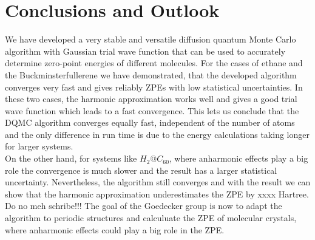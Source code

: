 \documentclass [12pt]{report}
\begin{document}
\chapter{Conclusions and Outlook}
We have developed a very stable and versatile diffusion quantum Monte Carlo algorithm with Gaussian trial wave function that can be used to accurately determine zero-point energies of different molecules. For the cases of ethane and the Buckminsterfullerene we have demonstrated, that the developed algorithm converges very fast and gives reliably ZPEs with low statistical uncertainties. In these two cases, the harmonic approximation works well and gives a good trial wave function which leads to a fast convergence. This lets us conclude that the DQMC algorithm converges equally fast, independent of the number of atoms and the only difference in run time is due to the energy calculations taking longer for larger systems. \\
On the other hand, for systems like $H_2@C_{60}$, where anharmonic effects play a big role the convergence is much slower and the result has a larger statistical uncertainty. Nevertheless, the algorithm still converges and with the result we can show that the harmonic approximation underestimates the ZPE by xxxx Hartree. \\
Do no meh schribe!!!
The goal of the Goedecker group is now to adapt the algorithm to periodic structures and calculuate the ZPE of molecular crystals, where anharmonic effects could play a big role in the ZPE.
\end{document}
